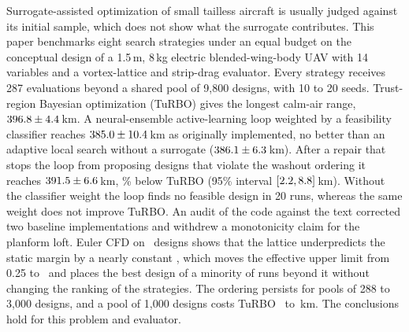 Surrogate-assisted optimization of small tailless aircraft is usually judged against its initial sample, which does not show what the surrogate contributes. This paper benchmarks eight search strategies under an equal budget on the conceptual design of a 1.5\,m, 8\,kg electric blended-wing-body UAV with 14 variables and a vortex-lattice and strip-drag evaluator. Every strategy receives 287 evaluations beyond a shared pool of 9,800 designs, with 10 to 20 seeds. Trust-region Bayesian optimization (TuRBO) gives the longest calm-air range, $396.8 \pm 4.4$\,km. A neural-ensemble active-learning loop weighted by a feasibility classifier reaches $385.0 \pm 10.4$\,km as originally implemented, no better than an adaptive local search without a surrogate ($386.1 \pm 6.3$\,km). After a repair that stops the loop from proposing designs that violate the washout ordering it reaches $391.5 \pm 6.6$\,km, \NvPctTurbovALR\% below TuRBO (95\% interval $[2.2, 8.8]$\,km). Without the classifier weight the loop finds no feasible design in 20 runs, whereas the same weight does not improve TuRBO. An audit of the code against the text corrected two baseline implementations and withdrew a monotonicity claim for the planform loft. Euler CFD on \NcalN\ designs shows that the lattice underpredicts the static margin by a nearly constant \NcalA, which moves the effective upper limit from 0.25 to \NcalCapEquiv\ and places the best design of a minority of runs beyond it without changing the ranking of the strategies. The ordering persists for pools of 288 to 3{,}000 designs, and a pool of 1{,}000 designs costs TuRBO \NpTurboLossB\ to \NpIndTurboVsFull\,km. The conclusions hold for this problem and evaluator.
